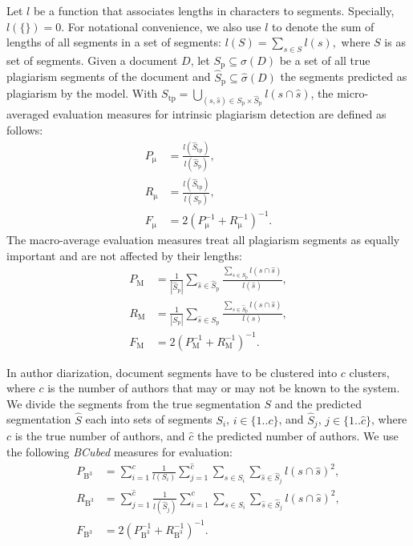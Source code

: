 \documentclass[10pt, a4paper]{article}
\begin{document}
Let $l$ be a function that associates lengths in characters to segments. Specially, $l(\{\}) = 0$. For notational convenience, we also use $l$ to denote the sum of lengths of all segments in a set of segments: $l(S) = \sum_{s\in S} l(s),$ where $S$ is as set of segments. Given a document $D$, let $S_\mathrm{p} \subseteq \sigma(D)$ be a set of all true plagiarism segments of the document and $\hat{S}_\mathrm{p} \subseteq \hat{\sigma}(D)$ the segments predicted as plagiarism by the  model. With ${S_\mathrm{tp} = \bigcup_{(s,\hat{s})\in S_\mathrm{p}\times\hat{S}_\mathrm{p}} l(s\cap\hat{s})}$, the micro-averaged evaluation measures for intrinsic plagiarism detection are defined as follows:
\begin{align}
P_\mathrm{\mu} &= \frac{l(\hat{S}_\mathrm{tp})}{l(\hat{S}_\mathrm{p})}, \\
R_\mathrm{\mu} &= \frac{l(\hat{S}_\mathrm{tp})}{l(S_\mathrm{p})}, \\
F_\mathrm{\mu} &= 2(P_\mathrm{\mu}^{-1}+R_\mathrm{\mu}^{-1})^{-1}.
\end{align}
The macro-average evaluation measures treat all plagiarism segments as equally important and are not affected by their lengths:
\begin{align}
P_\mathrm{M} &= \frac{1}{|\hat{S}_\mathrm{p}|}
	\sum_{\hat{s}\in\hat{S}_\mathrm{p}}
		\frac{{\sum_{s\in S_\mathrm{p}} l(s\cap\hat{s})}}{l(\hat{s})}, \\
R_\mathrm{M} &= \frac{1}{|S_\mathrm{p}|}
	\sum_{\hat{s}\in S_\mathrm{p}}
		\frac{{\sum_{s\in \hat{S}_\mathrm{p}} l(s\cap\hat{s})}}{l(s)}, \\
F_\mathrm{M} &= 2(P_\mathrm{M}^{-1}+R_\mathrm{M}^{-1})^{-1}.
\end{align}

In author diarization, document segments have to be clustered into $c$ clusters, where $c$ is the number of authors that may or may not be known to the system. We divide the segments from the true segmentation $S$ and the predicted segmentation $\hat{S}$ each into sets of segments $S_i$, $i\in\{1..c\}$, and $\hat{S}_j$, $j\in\{1..\hat{c}\}$, where $c$ is the true number of authors, and $\hat{c}$ the predicted number of authors. We use the following \emph{BCubed} measures for evaluation:
\begin{align}
P_{\mathrm{B}^3} &= \sum_{i=1}^c \frac{1}{l(S_i)}\sum_{j=1}^{\hat{c}}
	\sum_{s\in S_i}	\sum_{\hat{s}\in\hat{S}_j} l(s\cap \hat{s})^2, \\
R_{\mathrm{B}^3} &= \sum_{j=1}^{\hat{c}} \frac{1}{l(\hat{S}_j)}\sum_{i=1}^{c}
	\sum_{s\in S_i}	\sum_{\hat{s}\in\hat{S}_j} l(s\cap \hat{s})^2, \\
F_{\mathrm{B}^3} &= 2(P_{\mathrm{B}^3}^{-1}+R_{\mathrm{B}^3}^{-1})^{-1}.
\end{align}
\end{document}
